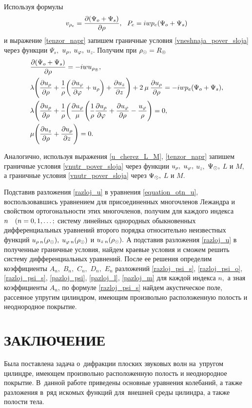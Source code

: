Используя формулы
$$v_{\rho_e}=\frac{\partial(\Psi_{o}+\Psi_s)}{\partial\rho},\:\:\: P_e=iwp_e(\Psi_{o}+\Psi_s)$$
и выражение \eqref{tenzor_napr} запишем граничные условия \eqref{vneshnaja_pover_sloja} через функции $\Psi_s,$ $u_\rho,$ $u_\varphi,$ $u_z$. Получим при $\rho_\odot=R_\circledcirc$
\begin{align}
&\frac{\partial(\Psi_{o}+\Psi_s)}{\partial\rho}=-iwu_{\rho_\circledcirc},\\
&\lambda\Biggl(\frac{\partial u_{\rho}}{\partial \rho}+\frac{1}{\rho}\biggl(\frac{\partial u_\varphi}{\partial\varphi}+u_{\rho}\biggr)+\frac{\partial u_z}{\partial z}\Biggr)+2\:\mu\:\frac{\partial u_{\rho}}{\partial \rho}=-iwp_e(\Psi_{o}+\Psi_s),\\
&\lambda\Biggl(\frac{\partial u_{\rho}}{\partial \rho}+\frac{1}{\rho}\biggl(\frac{\partial u_\varphi}\mu\Biggl(\frac{1}{\rho}\frac{\partial u_{\rho}}{\partial\varphi}+\frac{\partial u_\varphi}{\partial \rho}-\frac{u_{\varphi}}{\rho}\Biggr)=0,\\
&\mu\Biggl(\frac{\partial u_z}{\partial \rho}+\frac{\partial u_{\rho}}{\partial z}\Biggr)=0.
\end{align}

Аналогично, используя выражения \eqref{u_cherez_L_M}, \eqref{tenzor_napr} запишем граничные условия \eqref{vnutr_pover_sloja} через функции $u_\rho,$ $u_\varphi,$ $u_z,$ $ \Psi_\odot,$ $L$ и $M ,$ а граничные условия \eqref{vnutr_pover_sloja} через $\Psi_\odot,$ $L$ и $M.$

Подставив разложения \eqref{razloj_u} в уравнения \eqref{equation_otn_u}, воспользовавшись уравнением для присоединенных многочленов Лежандра и свойством ортогональности этих многочленов, получим для каждого индекса $n \quad(n = 0,1,\ldots;$ систему линейных однородных обыкновенных дифференциальных уравнений второго порядка относительно неизвестных функций $u_{\rho\:n}(\rho_\odot),$ $u_{\varphi\:n}(\rho_\odot)$ и $u_{z\:n}(\rho_\odot).$ А подставив разложения \eqref{razloj_u} в полученные граничные условия, найдем краевые условия и сможем решить  систему дифференциальных уравнений. После ее решения определим коэффициенты $A_n,$ $B_n,$ $C_n,$ $D_n,$ $E_n$ разложений  \eqref{razloj_psi_s}, \eqref{razloj_psi_o}, \eqref{razloj_psi_s}, \eqref{pazloj_psi}, \eqref{pazloj_l}, \eqref{pazloj_m} для каждой индекса $n,$ а зная коэффициенты ${A}_{n}$, по формуле \eqref{razloj_psi_s} найдем акустическое поле, рассеяное упругим цилиндром, имеющим произвольно расположенную полость и неоднородное покрытие.
\newpage

\newpage
\section*{ЗАКЛЮЧЕНИЕ}
Была поставлена задача о~дифракции плоских звуковых волн на~упругом цилиндре, имеющем произвольно расположенную полость и неоднородное покрытие. В~данной работе приведены основные уравнения колебаний, а также разложения в~ряд искомых функций для~внешней среды цилиндра, а также полости тела.
